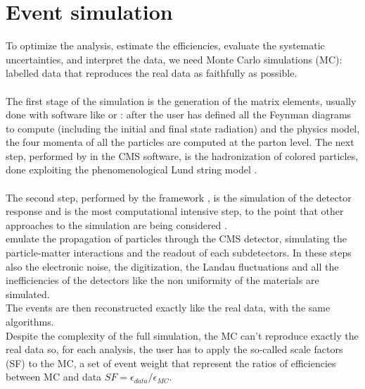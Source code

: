 \section{Event simulation}
To optimize the analysis, estimate the efficiencies, evaluate the systematic uncertainties, and interpret the data, we need Monte Carlo simulations (MC): labelled data that reproduces the real data as faithfully as possible.\\
\\
The first stage of the simulation is the generation of the matrix elements, usually done with software like \MADGRAPH \cite{Alwall2011MadGraphBeyond} or \POWHEG \cite{Alioli2010ABOX} : after the user has defined all the Feynman diagrams to compute (including the initial and final state radiation) and the physics model, the four momenta of all the particles are computed at the parton level.
The next step, performed by \PYTHIA \cite{Sjostrand2006PYTHIAManual} in the CMS software, is the hadronization of colored particles, done exploiting the phenomenological Lund string model \cite{Andersson1983PartonDynamics}.\\
\\
The second step, performed by the \GEANTfour framework \cite{Agostinelli2003GEANT4--aToolkit}, is the simulation of the detector response and is the most computational intensive step, to the point that other approaches to the simulation are being considered \cite{Sekmen2016RecentSimulation,Vaselli2023FlashSimFlow}.\\
\GEANT emulate the propagation of particles through the CMS detector, simulating the particle-matter interactions and the readout of each subdetectors. In these steps also the electronic noise, the digitization, the Landau fluctuations and all the inefficiencies of the detectors like the non uniformity of the materials are simulated.\\
The events are then reconstructed exactly like the real data, with the same algorithms.\\
Despite the complexity of the full simulation, the MC can't reproduce exactly the real data so, for each analysis, the user has to apply the so-called scale factors (SF) to the MC, a set of event weight that represent the ratios of efficiencies between MC and data $SF=\epsilon_{data}/\epsilon_{MC}$.

